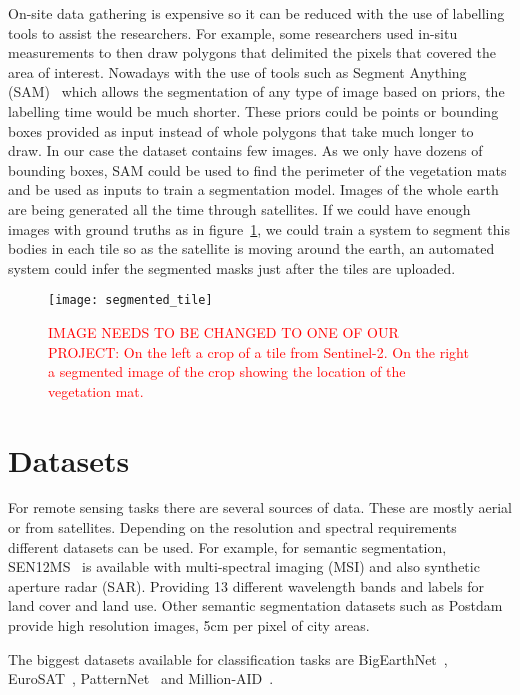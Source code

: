 \documentclass[conference]{IEEEtran}
\begin{document}
    On-site data gathering is expensive so it can be reduced with the use of labelling tools to assist the researchers.
    For example, some researchers used in-situ measurements to then draw polygons that delimited the pixels that covered the area of interest.
    Nowadays with the use of tools such as Segment Anything (SAM)~\cite{kirillov2023segment} which allows the segmentation of any type of image based on priors, the labelling time would be much shorter.
    These priors could be points or bounding boxes provided as input instead of whole polygons that take much longer to draw.
    In our case the dataset contains few images.
    As we only have dozens of bounding boxes, SAM could be used to find the perimeter of the vegetation mats and be used as inputs to train a segmentation model.
    Images of the whole earth are being generated all the time through satellites. If we could have enough images with ground truths as in figure~\ref{fig:tile-segmented},
    we could train a system to segment this bodies in each tile so as the satellite is moving around the earth, an automated system could infer the segmented masks just after the tiles are uploaded.

    \begin{figure}[h]
        \centering
        \texttt{[image: segmented\_tile]}
        \caption{\textcolor{red}{IMAGE NEEDS TO BE CHANGED TO ONE OF OUR PROJECT:
        On the left a crop of a tile from Sentinel-2. On the right a segmented image of the crop showing the
        location of the vegetation mat.}}
        \label{fig:tile-segmented}
    \end{figure}


    \section{Datasets}\label{sec:dataset}
    For remote sensing tasks there are several sources of data.
    These are mostly aerial or from satellites.
    Depending on the resolution and spectral requirements different datasets can be used.
    For example, for semantic segmentation, SEN12MS~\cite{SEN12MS_dataset} is available with multi-spectral imaging (MSI)
    and also synthetic aperture radar (SAR).
    Providing 13 different wavelength bands and labels for land cover and land use.
    Other semantic segmentation datasets such as Postdam~\cite{postdam_dataset} provide high resolution images, 5cm per pixel of
    city areas.

    The biggest datasets available for classification tasks are BigEarthNet~\cite{bigearthnet}, EuroSAT~\cite{helber2019eurosat},
    PatternNet~\cite{patternet} and Million-AID~\cite{millionaid}.
\end{document}
